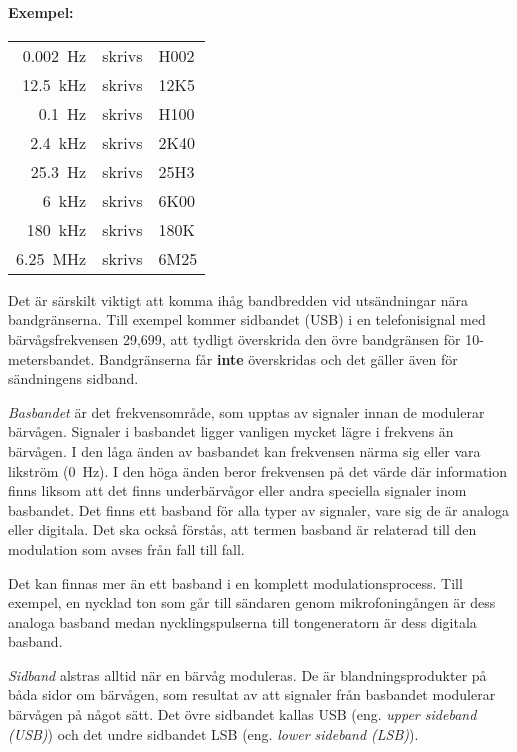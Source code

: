 \paragraph{Exempel:}

\begin{center}
\begin{tabular}{rll}
	\qty{0,002}{\hertz}     & skrivs & H002 \\
	\qty{12,5}{\kilo\hertz} & skrivs & 12K5 \\
	\qty{0,1}{\hertz}       & skrivs & H100 \\
	\qty{2,4}{\kilo\hertz}  & skrivs & 2K40 \\
	\qty{25,3}{\hertz}      & skrivs & 25H3 \\
	\qty{6}{\kilo\hertz}    & skrivs & 6K00 \\
	\qty{180}{\kilo\hertz}  & skrivs & 180K \\
	\qty{6,25}{\mega\hertz} & skrivs & 6M25 \\
\end{tabular}
\end{center}

Det är särskilt viktigt att komma ihåg bandbredden vid utsändningar nära
bandgränserna.
Till exempel kommer sidbandet (USB) i en telefonisignal med bärvågsfrekvensen 29,699,
att tydligt överskrida den övre bandgränsen för 10-metersbandet.
Bandgränserna får \textbf{inte} överskridas och det gäller även för sändningens
sidband.

\emph{Basbandet} är det frekvensområde, som upptas av signaler innan de
modulerar bärvågen.
Signaler i basbandet ligger vanligen mycket lägre i frekvens än bärvågen.
I den låga änden av basbandet kan frekvensen närma sig eller vara likström
(\qty{0}{\hertz}).
I den höga änden beror frekvensen på det värde där information finns liksom att
det finns underbärvågor eller andra speciella signaler inom basbandet.
Det finns ett basband för alla typer av signaler, vare sig de är analoga eller
digitala.
Det ska också förstås, att termen basband är relaterad till den modulation som
avses från fall till fall.

Det kan finnas mer än ett basband i en komplett modulationsprocess.
Till exempel, en nycklad ton som går till sändaren genom mikrofoningången är
dess analoga basband medan nycklingspulserna till tongeneratorn är dess digitala
basband.

\emph{Sidband} alstras alltid när en bärvåg moduleras.
De är blandningsprodukter på båda sidor om bärvågen, som resultat av att
signaler från basbandet modulerar bärvågen på något sätt.
Det övre sidbandet kallas USB (eng. \emph{upper sideband (USB)})
och det undre sidbandet LSB (eng. \emph{lower sideband (LSB)}).

